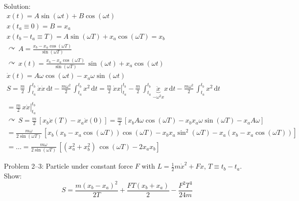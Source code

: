 \documentclass[fontsize=11pt,a4paper]{scrartcl}
\begin{document}
Solution:
\begin{gather*}
	x(t)=A\sin(\omega t)+B\cos(\omega t)\\
	x(t_a\equiv 0)=B=x_a\\
	x(t_b-t_a\equiv T)=A\sin(\omega T)+x_a\cos(\omega T)=x_b\\
	\curvearrowright\,A=\frac{x_b-x_a\cos(\omega T)}{\sin(\omega T)}\\
	\curvearrowright\,x(t)=\frac{x_b-x_a\cos(\omega T)}{\sin(\omega T)}\,\sin(\omega t)+x_a\cos(\omega t)\\
	\dot x(t)=A\omega\cos(\omega t)-x_a\omega\sin(\omega t)\\
	S=\frac{m}{2}\,\int_{t_a}^{t_b} \dot x\dot x\,\mathrm{d}t-\frac{m\omega^2}{2}\,\int_{t_a}^{t_b} x^2\,\mathrm{d}t=\left.\frac{m}{2}\,\dot x x\right|_{t_a}^{t_b}-\frac{m}{2}\,\int_{t_a}^{t_b}\underbrace{\ddot x}_{-\omega^2 x} x\,\mathrm{d}t-\frac{m\omega^2}{2}\,\int_{t_a}^{t_b} x^2\,\mathrm{d}t\\=\left.\frac{m}{2}\,x\dot x\right|_{t_a}^{t_b}\\
	\curvearrowright\,S=\frac{m}{2}\,\left[x_b\dot x(T)-x_a\dot x(0)\right]=\frac{m}{2}\,\left[x_b A\omega\cos(\omega T)-x_b x_a\omega\sin(\omega T)-x_a A\omega\right]\\
	=\frac{m\omega}{2\sin(\omega T)}\,\left[x_b\left(x_b-x_a\cos(\omega T)\right)\cos(\omega T)-x_b x_a\sin^2(\omega T)-x_a\left(x_b-x_a\cos(\omega T)\right)\right]\\
	=\dots=\frac{m\omega}{2\sin(\omega T)}\,\left[(x_a^2+x_b^2)\,\cos(\omega T)-2x_a x_b\right]
\end{gather*}

Problem 2--3: Particle under constant force $F$ with $L=\frac{1}{2}m\dot x^2+Fx$, $T\equiv t_b-t_a$. Show:
\[
	S=\frac{m(x_b-x_a)^2}{2T}+\frac{FT(x_b+x_a)}{2}-\frac{F^2 T^3}{24 m}
\]
\end{document}
